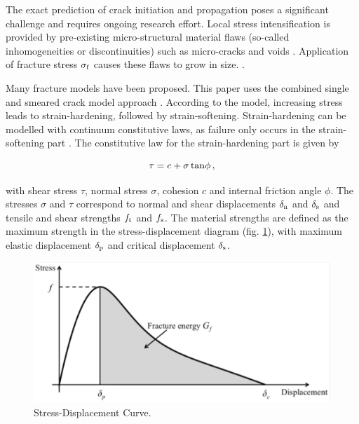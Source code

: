 \documentclass[12pt,twoside]{article}
\theoremstyle{break}
\begin{document}
\bigbreak
The exact prediction of crack initiation and propagation poses a significant challenge and requires ongoing research effort. Local stress intensification is provided by pre-existing micro-structural material flaws (so-called inhomogeneities or discontinuities) such as micro-cracks and voids \cite{Sch12}. Application of fracture stress $\sigma_{\rm{f}}$ causes these flaws to grow in size. \cite{Flo98, Pel16}.

\bigbreak
Many fracture models have been proposed. This paper uses the combined single and smeared crack model approach \cite{Mun99, Lat15}. According to the model, increasing stress leads to strain-hardening, followed by strain-softening. Strain-hardening can be modelled with continuum constitutive laws, as failure only occurs in the strain-softening part \cite{Mun13}. The constitutive law for the strain-hardening part is given by

\begin{equation}
    \tau=c+\sigma\,{\rm{tan}}\phi\,,
\end{equation}

with shear stress $\tau$, normal stress $\sigma$, cohesion $c$ and internal friction angle $\phi$. The stresses $\sigma$ and $\tau$ correspond to normal and shear displacements $\delta_{\rm{n}}$ and $\delta_{\rm{s}}$ and tensile and shear strengths $f_{\rm{t}}$ and $f_{\rm{s}}$. The material strengths are defined as the maximum strength in the stress-displacement diagram (fig. \ref{fig:FractureEnergy}), with maximum elastic displacement $\delta_{\rm{p}}$ and critical displacement $\delta_{\rm{s}}$.

\begin{figure}[!htbp]
    \centering
    \includegraphics[width=\textwidth*2/3]{FractureEnergy}
    \caption{Stress-Displacement Curve. \cite{Lat15}}
    \label{fig:FractureEnergy}
\end{figure}
\end{document}
